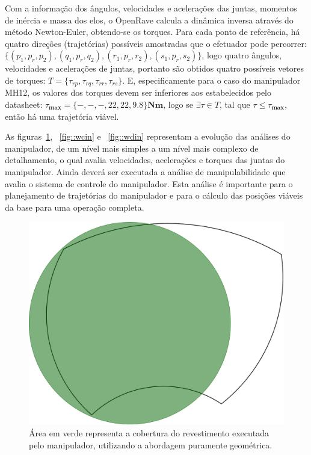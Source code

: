 Com a informação dos ângulos, velocidades e acelerações das juntas, momentos
de inércia e massa dos elos, o OpenRave calcula a dinâmica inversa através do
método Newton-Euler, obtendo-se os torques. Para cada ponto de referência, há quatro direções
(trajetórias) possíveis amostradas que o efetuador pode percorrer:
$\{(p_1,p_r,p_2),(q_1,p_r,q_2),(r_1,p_r,r_2),(s_1,p_r,s_2)\}$, logo quatro
ângulos, velocidades e acelerações de juntas, portanto são obtidos quatro
possíveis vetores de torques:
$T=\{\tau_{rp},\tau_{rq},\tau_{rr},\tau_{rs}\}$. E, especificamente para o
caso do manipulador MH12, os valores dos torques devem ser inferiores aos
estabelecidos pelo datasheet:
$\tau_{\textbf{max}}=\{-,-,-,22,22,9.8\}\textbf{Nm}$, logo se $\exists \tau\in
T$, tal que $\tau\leq\tau_{\textbf{max}}$, então há uma trajetória viável.

As figuras~\ref{fig::wgeo}, ~\ref{fig::wcin} e ~\ref{fig::wdin} representam a
evolução das análises do manipulador, de um nível mais simples a um nível mais
complexo de detalhamento, o qual avalia velocidades, acelerações e torques das
juntas do manipulador. Ainda deverá ser executada a análise de manipulabilidade
que avalia o sistema de controle do manipulador. Esta análise é importante para
o planejamento de trajetórias do manipulador e para o cálculo das posições
viáveis da base para uma operação completa.



\begin{figure}[h!]	
	\includegraphics[width=\columnwidth]{figs/dinamica/workspaceGeometrico.png}
	\caption{Área em verde representa a cobertura do revestimento executada pelo
	manipulador, utilizando a abordagem puramente geométrica.}
	\label{fig::wgeo}
\end{figure}

